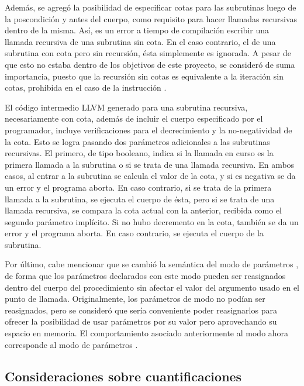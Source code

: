 Además, se agregó la posibilidad de especificar cotas para las subrutinas luego
de la poscondición y antes del cuerpo, como requisito para hacer llamadas
recursivas dentro de la misma. Así, es un error a tiempo de compilación escribir
una llamada recursiva de una subrutina sin cota. En el caso contrario, el de una
subrutina con cota pero sin recursión, ésta simplemente es ignorada. A pesar de
que esto no estaba dentro de los objetivos de este proyecto, se consideró de
suma importancia, puesto que la recursión sin cotas es equivalente a la
iteración sin cotas, prohibida en el caso de la instrucción .

El código intermedio LLVM generado para una subrutina recursiva, necesariamente
con cota, además de incluir el cuerpo especificado por el programador, incluye
verificaciones para el decrecimiento y la no-negatividad de la cota. Esto se
logra pasando dos parámetros adicionales a las subrutinas recursivas. El
primero, de tipo booleano, indica si la llamada en curso es la primera llamada a
la subrutina o si se trata de una llamada recursiva. En ambos casos, al entrar a
la subrutina se calcula el valor de la cota, y si es negativa se da un error y
el programa aborta. En caso contrario, si se trata de la primera llamada a la
subrutina, se ejecuta el cuerpo de ésta, pero si se trata de una llamada
recursiva, se compara la cota actual con la anterior, recibida como el segundo
parámetro implícito. Si no hubo decremento en la cota, también se da un error y
el programa aborta. En caso contrario, se ejecuta el cuerpo de la subrutina.

Por último, cabe mencionar que se cambió la semántica del modo de parámetros
, de forma que los parámetros declarados con este modo pueden ser
reasignados dentro del cuerpo del procedimiento sin afectar el valor del
argumento usado en el punto de llamada. Originalmente, los parámetros de modo
 no podían ser reasignados, pero se consideró que sería conveniente
poder reasignarlos para ofrecer la posibilidad de usar parámetros por su valor
pero aprovechando su espacio en memoria. El comportamiento asociado
anteriormente al modo  ahora corresponde al modo de parámetros
.

\subsection{Consideraciones sobre cuantificaciones}


